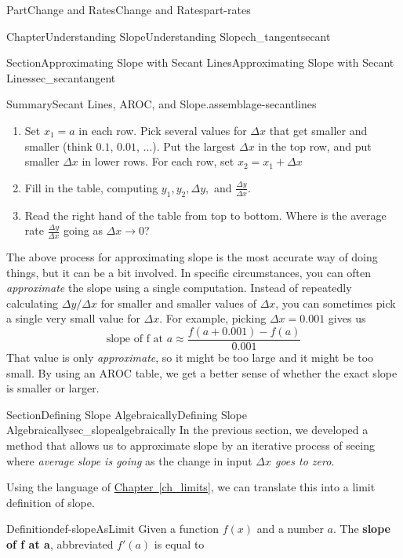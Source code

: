 \documentclass{tufte-book}
\newcommand{\xreffont}{\relax}
\newcommand{\terminology}[1]{\textbf{#1}}
\numberwithin{equation}{chapter}
\begin{document}
\begin{partptx}{Part}{Change and Rates}{}{Change and Rates}{}{}{part-rates}
\begin{chapterptx}{Chapter}{Understanding Slope}{}{Understanding Slope}{}{}{ch_tangentsecant}
\begin{sectionptx}{Section}{Approximating Slope with Secant Lines}{}{Approximating Slope with Secant Lines}{}{}{sec_secantangent}
\begin{assemblage}{Summary}{Secant Lines, AROC, and Slope.}{assemblage-secantlines}
\begin{itemize}[label=\textbullet]
\begin{enumerate}
\item{}Set \(x_1=a\) in each row. Pick several values for \(\Delta x\) that get smaller and smaller (think \(0.1\), \(0.01\), \(\dots\)). Put the largest \(\Delta x\) in the top row, and put smaller \(\Delta x \) in lower rows. For each row, set \(x_2 = x_1 + \Delta x\)%
\item{}Fill in the table, computing \(y_1,y_2,\Delta y,\) and \(\frac{\Delta y}{\Delta x}\).%
\item{}Read the right hand of the table from top to bottom.  Where is the average rate \(\frac{\Delta y}{\Delta x}\) going as \(\Delta x\rightarrow 0\)?%
\end{enumerate}
%
\end{itemize}
%
\end{assemblage}
The above process for approximating slope is the most accurate way of doing things, but it can be a bit involved. In specific circumstances, you can often \emph{approximate} the slope using a single computation.  Instead of repeatedly calculating \(\Delta y/\Delta x\) for smaller and smaller values of \(\Delta x\), you can sometimes pick a single very small value for \(\Delta x\). For example, picking \(\Delta x = 0.001\) gives us%
\begin{equation*}
\text{slope of f at }a \approx \dfrac{f(a+0.001) - f(a) }{0.001}
\end{equation*}
That value is only \emph{approximate}, so it might be too large and it might be too small. By using an AROC table, we get a better sense of whether the exact slope is smaller or larger.%
\end{sectionptx}
%
%
\typeout{************************************************}
\typeout{************************************************}
%
\begin{sectionptx}{Section}{Defining Slope Algebraically}{}{Defining Slope Algebraically}{}{}{sec_slopealgebraically}
In the previous section, we developed a method that allows us to approximate slope by an iterative process of seeing where \emph{average slope is going} as the change in input \emph{\(\Delta x\) goes to zero}.%
\par
Using the language of \hyperref[ch_limits]{Chapter~{\xreffont\ref{ch_limits}}}, we can translate this into a limit definition of slope.%
\begin{definition}{Definition}{}{def-slopeAsLimit}%
Given a function \(f(x)\) and a number \(a\). The \terminology{slope of f at a}, abbreviated \(f'(a)\) is equal to%

\end{definition}
\end{sectionptx}
\end{chapterptx}
\end{partptx}
\end{document}
